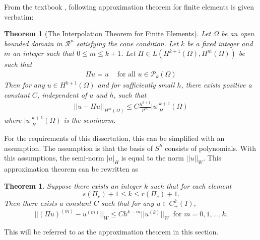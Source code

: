 \documentclass[../../main.tex]{subfiles}
\begin{document}
From the textbook \cite{OR76}, following approximation theorem for finite elements is given verbatim:
\newtheorem*{Interpolation}{Theorem}
\begin{Interpolation}[The Interpolation Theorem for Finite Elements] 
	Let $\Omega$ be an open bounded domain in $\mathcal{R}^n$ satisfying the cone condition. Let $k$ be a fixed integer and $m$ an integer such that $0\leq m \leq k+1$. Let $\Pi \in L(H^{k+1}(\Omega), H^{m}(\Omega))$ be such that
	\begin{eqnarray}
	    \Pi u = u \ \ \ \ \textrm{ for all } u \in \mathcal{P}_k(\Omega)
	\end{eqnarray}
	Then for any $u \in H^{k+1}(\Omega)$ and for sufficiently small $h$, there exists positive a constant $C$, independent of $u$ and $h$, such that
	\begin{eqnarray}
	    ||u - \Pi u||_{H^m(\Omega)} \leq C \frac{h^{k+1}}{p^m} |u|_H^{k+1}(\Omega)
	\end{eqnarray}
	where $|u|_H^{k+1}(\Omega)$ is the seminorm.
\end{Interpolation}

For the requirements of this dissertation, this can be simplified with an assumption. The assumption is that the basis of $S^h$ consists of polynomials. With this assumptions, the semi-norm $|u|_H$ is equal to the norm $||u||_{W}$. This approximation theorem can be rewritten as
\newtheorem{Interpolation_2}{Theorem}
\begin{Interpolation_2}
	Suppose there exists an integer $k$ such that for each element
	\begin{equation*}
		s(\Pi_e) + 1 \leq k \leq r(\Pi_e) +1.
	\end{equation*}
	Then there exists a constant $C$ such that for any $u \in C^k_+(I)$,
	\begin{equation*}
		||(\Pi u)^{(m)} - u^{(m)}||_{W} \leq C h^{k-m} || u^{(k)}||_{W} \ \text{ for } m = 0,1,...,k.
	\end{equation*}
\end{Interpolation_2}

This will be referred to as the approximation theorem in this section.
\end{document}
